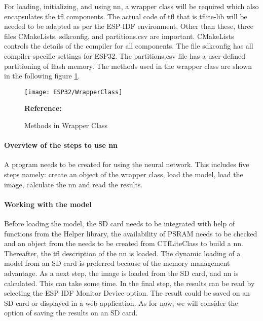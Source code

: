 For loading, initializing, and using \ac{nn}, a wrapper class will be required which also encapsulates the \ac{tfl} components. The actual code of \ac{tfl} that is tflite-lib will be needed to be adapted as per the ESP-IDF environment. Other than these, three files CMakeLists, sdkconfig, and partitions.csv are important. CMakeLists controls the details of the compiler for all components. The file sdkconfig has all compiler-specific settings for ESP32. The partitions.csv file has a user-defined partitioning of flash memory. The methods used in the wrapper class are shown in the following figure \ref{fig:WrapperClass}. \cite{Mueller:2022Part3}

\begin{figure}  
	\begin{center}
		\texttt{[image: ESP32/WrapperClass]}
		\caption{Methods in Wrapper Class} \label{fig:WrapperClass}
		{\footnotesize \textbf{Reference:} \cite{Mueller:2022Part3}}
	\end{center}
\end{figure}

\paragraph{Overview of the steps to use \ac{nn}}

A program needs to be created for using the neural network. This includes five steps namely: create an object of the wrapper class, load the model, load the image, calculate the \ac{nn} and read the results.

\paragraph{Working with the model}

Before loading the model, the SD card needs to be integrated with help of functions from the Helper library, the availability of PSRAM needs to be checked and an object from the needs to be created from CTfLiteClass to build a \ac{nn}.
Thereafter, the \ac{tfl} description of the \ac{nn} is loaded. The dynamic loading of a model from an SD card is preferred because of the memory management advantage. As a next step, the image is loaded from the SD card, and \ac{nn} is calculated. This can take some time. In the final step, the results can be read by selecting the ESP IDF Monitor Device option. The result could be saved on an SD card or displayed in a web application. As for now, we will consider the option of saving the results on an SD card.

